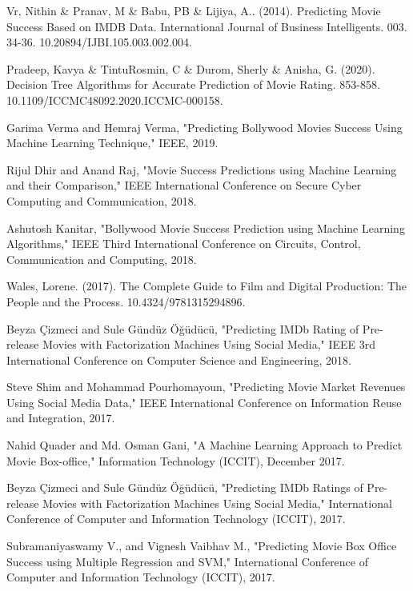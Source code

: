 \documentclass[conference]{IEEEtran}
\begin{document}
\begin{thebibliography}{1}
    Vr, Nithin \& Pranav, M \& Babu, PB \& Lijiya, A.. (2014). Predicting Movie Success Based on IMDB Data. International Journal of Business Intelligents. 003. 34-36. 10.20894/IJBI.105.003.002.004. 
    
    Pradeep, Kavya \& TintuRosmin, C \& Durom, Sherly \& Anisha, G. (2020). Decision Tree Algorithms for Accurate Prediction of Movie Rating. 853-858. 10.1109/ICCMC48092.2020.ICCMC-000158. 
    
    Garima Verma and Hemraj Verma, "Predicting Bollywood Movies Success Using Machine Learning Technique," IEEE, 2019.
    
    Rijul Dhir and Anand Raj, "Movie Success Predictions using Machine Learning and their Comparison," IEEE International Conference on Secure Cyber Computing and Communication, 2018.
    
    Ashutosh Kanitar, "Bollywood Movie Success Prediction using Machine Learning Algorithms," IEEE Third International Conference on Circuits, Control, Communication and Computing, 2018.
    
    Wales, Lorene. (2017). The Complete Guide to Film and Digital Production: The People and the Process. 10.4324/9781315294896. 
    
    Beyza Çizmeci and Sule Gündüz Öğüdücü, "Predicting IMDb Rating of Pre-release Movies with Factorization Machines Using Social Media," IEEE 3rd International Conference on Computer Science and Engineering, 2018.
    
    Steve Shim and Mohammad Pourhomayoun, "Predicting Movie Market Revenues Using Social Media Data," IEEE International Conference on Information Reuse and Integration, 2017.
    
    Nahid Quader and Md. Osman Gani, "A Machine Learning Approach to Predict Movie Box-office," Information Technology (ICCIT), December 2017.
    
    Beyza Çizmeci and Sule Gündüz Öğüdücü, "Predicting IMDb Ratings of Pre-release Movies with Factorization Machines Using Social Media," International Conference of Computer and Information Technology (ICCIT), 2017.
    
    Subramaniyaswamy V., and Vignesh Vaibhav M., "Predicting Movie Box Office Success using Multiple Regression and SVM," International Conference of Computer and Information Technology (ICCIT), 2017.
    

\end{thebibliography}
\end{document}
